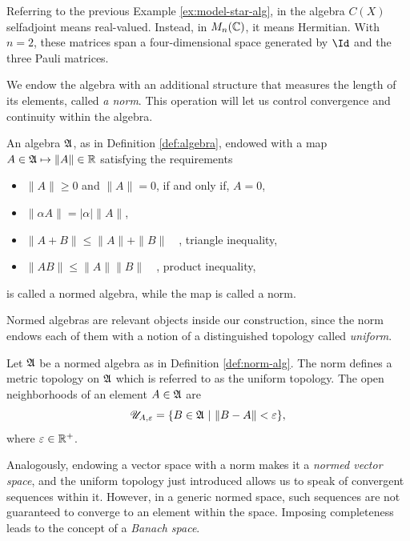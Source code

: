 	\begin{example}\label{ex:selfadj-models}
		Referring to the previous Example \ref{ex:model-star-alg}, in the algebra $C(X)$ selfadjoint means real-valued. Instead, in $M_n(\mathbb{C})$, it means Hermitian. With $n=2$, these matrices span a four-dimensional space generated by $\Id$ and the three Pauli matrices.
	\end{example}
	
	\noindent We endow the algebra with an additional structure that measures the length of its elements, called \emph{a norm}. This operation will let us control convergence and continuity within the algebra.
	
	\begin{definition}\label{def:norm-alg}
		An algebra $\mathfrak{A}$, as in Definition \ref{def:algebra}, endowed with a map $A \in \mathfrak{A} \mapsto \|A\| \in \mathbb{R}$ satisfying the requirements
		\begin{itemize}
			\item $\|A\| \geq 0$ and $\|A\| = 0$, if and only if, $A = 0$,
			\item $\|\alpha A\| = |\alpha| \|A\|$,
			\item $\|A + B\| \leq \|A\| + \|B\| \quad$,  triangle inequality,
			\item $\|AB\| \leq \|A\| \|B\| \quad $, product inequality,
		\end{itemize}
		is called a normed algebra, while the map is called a norm.
	\end{definition}
	
	\noindent Normed algebras are relevant objects inside our construction, since the norm endows each of them with a notion of a distinguished topology called \emph{uniform}.
	
	\begin{definition}\label{def:uni-top}
		Let $\mathfrak{A}$ be a normed algebra as in Definition \ref{def:norm-alg}. The norm defines a metric topology on $\mathfrak{A}$ which is referred to as the uniform topology. The open neighborhoods of an element $A \in \mathfrak{A}$ are $$\mathscr{U}_{A, \varepsilon} = \{B \in \A \ | \ \|B - A\| < \varepsilon\},$$ where $\varepsilon \in \mathbb{R}^+$. 
	\end{definition}
	
	\noindent Analogously, endowing a vector space with a norm makes it a \emph{normed vector space}, and the uniform topology just introduced allows us to speak of convergent sequences within it. However, in a generic normed space, such sequences are not guaranteed to converge to an element within the space. Imposing completeness leads to the concept of a \emph{Banach space}.
	
